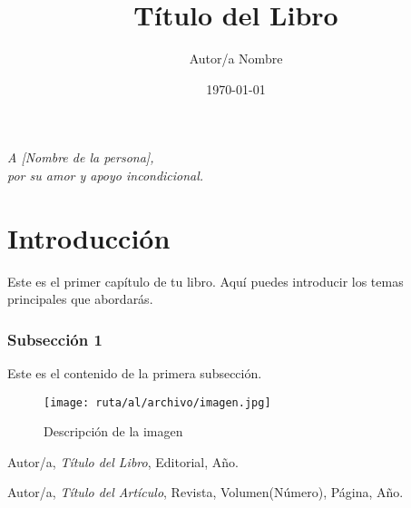 \documentclass[12pt]{book}
\title{Título del Libro}
\author{Autor/a Nombre}
\date{\today}
\begin{document}
\maketitle

\newpage
\thispagestyle{empty}
\vspace*{1cm}
\begin{flushright}
    \textit{A [Nombre de la persona],\\
    por su amor y apoyo incondicional.}
\end{flushright}

\tableofcontents
\newpage

\chapter{Introducción}
Este es el primer capítulo de tu libro. Aquí puedes introducir los temas principales que abordarás.


\subsection{Subsección 1}
Este es el contenido de la primera subsección.

\begin{figure}[h]
    \centering
    \texttt{[image: ruta/al/archivo/imagen.jpg]}
    \caption{Descripción de la imagen}
    \label{fig:mi_imagen}
\end{figure}

\begin{thebibliography}{9}
    Autor/a, \textit{Título del Libro}, Editorial, Año.

    Autor/a, \textit{Título del Artículo}, Revista, Volumen(Número), Página, Año.
\end{thebibliography}
\end{document}
